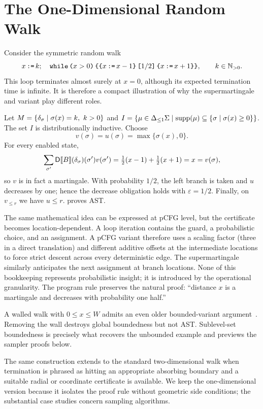 \section{The One-Dimensional Random Walk}
\label{sec:walk}

Consider the symmetric random walk
\[
 x\,\textnormal{\texttt{:=}}\, k;\quad
 \textnormal{\texttt{while}}\,\textnormal{\texttt{(}} x>0\textnormal{\texttt{)}}\,\textnormal{\texttt{\{}}\textnormal{\texttt{\{}}x\,\textnormal{\texttt{:=}}\, x-1\textnormal{\texttt{\}}} \, \textnormal{\texttt{[}}1/2\textnormal{\texttt{]}} \, \textnormal{\texttt{\{}}x\,\textnormal{\texttt{:=}}\, x+1\textnormal{\texttt{\}}}\textnormal{\texttt{\}}},
 \qquad k\in\mathbb{N}_{>0}.
\]
This loop terminates almost surely at $x=0$, although its expected termination time is infinite. It is therefore a compact illustration of why the supermartingale and variant play different roles.

Let $M=\{\dirac{\sigma}\mid\sigma(x)=k,\ k>0\}$ and
$I=\{\mu\in{\Delta_{\leq 1}\Sigma}\mid\textnormal{supp}(\mu)\subseteq\{\sigma\mid\sigma(x)\geq0\}\}$.
The set $I$ is distributionally inductive. Choose
\[
 v(\sigma)=u(\sigma)=\max\{\sigma(x),0\}.
\]
For every enabled state,
\[
 \sum_{\sigma'}\mathsf{D}\llbracket B\rrbracket(\delta_{\sigma})(\sigma')v(\sigma')
 =\tfrac12(x-1)+\tfrac12(x+1)=x=v(\sigma),
\]
so $v$ is in fact a martingale. With probability $1/2$, the left branch is taken and $u$ decreases by one; hence the decrease obligation holds with $\varepsilon=1/2$. Finally, on $v_{\le r}$ we have $u\le r$.  proves AST.

The same mathematical idea can be expressed at pCFG level, but the certificate becomes location-dependent. A loop iteration contains the guard, a probabilistic choice, and an assignment. A pCFG variant therefore uses a scaling factor (three in a direct translation) and different additive offsets at the intermediate locations to force strict descent across every deterministic edge. The supermartingale similarly anticipates the next assignment at branch locations. None of this bookkeeping represents probabilistic insight; it is introduced by the operational granularity. The program rule preserves the natural proof: ``distance $x$ is a martingale and decreases with probability one half.''

A walled walk with $0\le x\le W$ admits an even older bounded-variant argument~\cite{DBLP:series/mcs/McIverM05}. Removing the wall destroys global boundedness but not AST. Sublevel-set boundedness is precisely what recovers the unbounded example and previews the sampler proofs below.

The same construction extends to the standard two-dimensional walk when termination is phrased as hitting an appropriate absorbing boundary and a suitable radial or coordinate certificate is available. We keep the one-dimensional version because it isolates the proof rule without geometric side conditions; the substantial case studies concern sampling algorithms.
